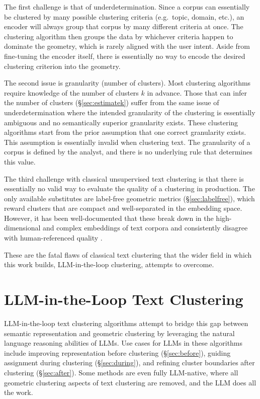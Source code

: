 \documentclass[11pt,a4paper,oneside]{report}
\begin{document}
The first challenge is that of underdetermination. Since a corpus can essentially be clustered by many possible clustering criteria (e.g.\ topic, domain, etc.), an encoder will always group that corpus by many different criteria at once. The clustering algorithm then groups the data by whichever criteria happen to dominate the geometry, which is rarely aligned with the user intent. Aside from fine-tuning the encoder itself, there is essentially no way to encode the desired clustering criterion into the geometry.

The second issue is granularity (number of clusters). Most clustering algorithms require knowledge of the number of clusters $k$ in advance. Those that can infer the number of clusters (\S\ref{sec:estimatek}) suffer from the same issue of underdetermination where the intended granularity of the clustering is essentially ambiguous and no semantically superior granularity exists. These clustering algorithms start from the prior assumption that one correct granularity exists. This assumption is essentially invalid when clustering text. The granularity of a corpus is defined by the analyst, and there is no underlying rule that determines this value.

The third challenge with classical unsupervised text clustering is that there is essentially no valid way to evaluate the quality of a clustering in production. The only available substitutes are label-free geometric metrics (\S\ref{sec:labelfree}), which reward clusters that are compact and well-separated in the embedding space. However, it has been well-documented that these break down in the high-dimensional and complex embeddings of text corpora and consistently disagree with human-referenced quality \citep{petukhova2025text,wang2025deep}.

These are the fatal flaws of classical text clustering that the wider field in which this work builds, LLM-in-the-loop clustering, attempts to overcome.

\section{LLM-in-the-Loop Text Clustering}

LLM-in-the-loop text clustering algorithms attempt to bridge this gap between semantic representation and geometric clustering by leveraging the natural language reasoning abilities of LLMs. Use cases for LLMs in these algorithms include improving representation before clustering (\S\ref{sec:before}), guiding assignment during clustering (\S\ref{sec:during}), and refining cluster boundaries after clustering (\S\ref{sec:after}). Some methods are even fully LLM-native, where all geometric clustering aspects of text clustering are removed, and the LLM does all the work.
\end{document}
